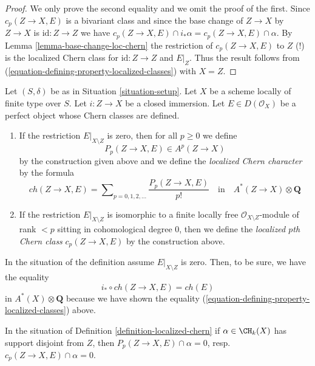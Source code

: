 \begin{proof}
We only prove the second equality and we omit the proof of the first.
Since $c_p(Z \to X, E)$ is a bivariant class and since the base
change of $Z \to X$ by $Z \to X$ is $\text{id} : Z \to Z$ we have
$c_p(Z \to X, E) \cap i_*\alpha = c_p(Z \to X, E) \cap \alpha$.
By Lemma \ref{lemma-base-change-loc-chern} the restriction of
$c_p(Z \to X, E)$ to $Z$ (!) is the localized Chern class for
$\text{id} : Z \to Z$ and $E|_Z$. Thus the result follows from
(\ref{equation-defining-property-localized-classes}) with $X = Z$.
\end{proof}

\begin{definition}
\label{definition-localized-chern}
Let $(S, \delta)$ be as in Situation \ref{situation-setup}. Let $X$ be a scheme
locally of finite type over $S$. Let $i : Z \to X$ be a closed immersion.
Let $E \in D(\mathcal{O}_X)$ be a perfect object whose Chern classes
are defined.
\begin{enumerate}
\item If the restriction $E|_{X \setminus Z}$ is zero, then for all
$p \geq 0$ we define
$$
P_p(Z \to X, E) \in A^p(Z \to X)
$$
by the construction given above and we define the
{\it localized Chern character} by the formula
$$
ch(Z \to X, E) =
\sum\nolimits_{p = 0, 1, 2, \ldots} \frac{P_p(Z \to X, E)}{p!}
\quad\text{in}\quad A^*(Z \to X) \otimes \mathbf{Q}
$$
\item If the restriction $E|_{X \setminus Z}$ is isomorphic to a
finite locally free $\mathcal{O}_{X \setminus Z}$-module of rank $< p$
sitting in cohomological degree $0$, then we define the
{\it localized $p$th Chern class} $c_p(Z \to X, E)$ by the construction above.
\end{enumerate}
\end{definition}

\noindent
In the situation of the definition assume $E|_{X \setminus Z}$ is zero.
Then, to be sure, we have the equality
$$
i_* \circ ch(Z \to X, E) = ch(E)
$$
in $A^*(X) \otimes \mathbf{Q}$ because we have shown the
equality (\ref{equation-defining-property-localized-classes}) above.

\begin{lemma}
\label{lemma-loc-chern-disjoint}
In the situation of Definition \ref{definition-localized-chern}
if $\alpha \in \CH_k(X)$ has support disjoint from $Z$, then
$P_p(Z \to X, E) \cap \alpha = 0$, resp.\ $c_p(Z \to X, E) \cap \alpha = 0$.
\end{lemma}

